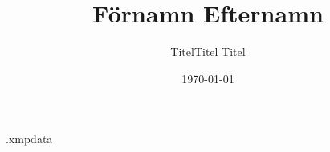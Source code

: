 \begin{filecontents*}{\jobname.xmpdata}
\end{filecontents*}


\documentclass[a4paper,12pt,hidelinks]{article}
\usepackage[left=4.5cm, right=2.5cm, top=2.5cm, bottom=2.5cm]{geometry}



\author{TitelTitel Titel}
\date{\today}
\title{Förnamn Efternamn}





\setcounter{page}{1}

% 

\tableofcontents
\newpage

\printglossary{}
\newpage

\setcounter{page}{1}

\renewcommand{\baselinestretch}{1.3}\normalsize



% 
% 
% 
% 

\printbibliography[heading=bibintoc]{}


